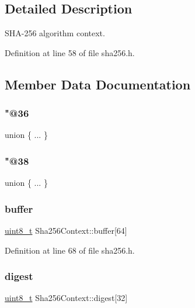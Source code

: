 \subsection{Detailed Description}
S\+H\+A-\/256 algorithm context. 

Definition at line 58 of file sha256.\+h.



\subsection{Member Data Documentation}
\mbox{\label{structSha256Context_a14353168c9e2821b96ba5deb638286fc}} 
\subsubsection{\texorpdfstring{"@36}{@36}}
{\footnotesize\ttfamily union \{ ... \} }

\mbox{\label{structSha256Context_a5577586aed8a14fcf43e321f9ea1335a}} 
\subsubsection{\texorpdfstring{"@38}{@38}}
{\footnotesize\ttfamily union \{ ... \} }

\mbox{\label{structSha256Context_a8f0a383e52f3ffd7f2e07473d0e755ba}} 
\subsubsection{\texorpdfstring{buffer}{buffer}}
{\footnotesize\ttfamily \hyperlink{stdint_8h_aba7bc1797add20fe3efdf37ced1182c5}{uint8\+\_\+t} Sha256\+Context\+::buffer\mbox{[}64\mbox{]}}



Definition at line 68 of file sha256.\+h.

\mbox{\label{structSha256Context_ab41942b2bb42e4a07e95c6e09e26b2f5}} 
\subsubsection{\texorpdfstring{digest}{digest}}
{\footnotesize\ttfamily \hyperlink{stdint_8h_aba7bc1797add20fe3efdf37ced1182c5}{uint8\+\_\+t} Sha256\+Context\+::digest\mbox{[}32\mbox{]}}



